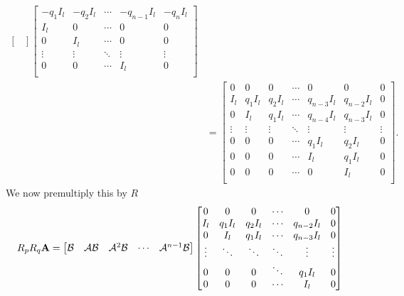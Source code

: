 \begin{appendices}
\begin{equation*}
\begin{split}
\begin{bmatrix}
        \end{bmatrix}
        \begin{bmatrix}
            -q_1I_l & -q_2I_l & \cdots & -q_{n-1}I_l & -q_nI_l \\
            I_l & 0 & \cdots & 0 & 0 \\
            0 & I_l & \cdots & 0 & 0 \\
            \vdots & \vdots & \ddots & \vdots & \vdots \\
            0 & 0 & \cdots & I_l & 0 \\
        \end{bmatrix} \\
        &= 
        \begin{bmatrix}
            0 & 0 & 0 & \cdots & 0 & 0 & 0 \\
            I_l & q_1I_l & q_2I_l & \cdots & q_{n-3}I_l & q_{n-2}I_l & 0 \\ 
            0 & I_l & q_1I_l & \cdots & q_{n-4}I_l & q_{n-3}I_l & 0 \\ 
            \vdots & \vdots & \vdots & \ddots & \vdots & \vdots & \vdots \\
            0 & 0 & 0 & \cdots & q_1I_l & q_2I_l & 0 \\
            0 & 0 & 0 & \cdots & I_l & q_1I_l & 0 \\
            0 & 0 & 0 & \cdots & 0 & I_l & 0 \\
        \end{bmatrix}.
    \end{split} 
\end{equation*}
We now premultiply this by $R$
\begin{equation*}
    \begin{split}
        R_pR_q\mathbf{A} &= 
        \begin{bmatrix}
            \mathcal{B} & \mathcal{A}\mathcal{B} & \mathcal{A}^{2}\mathcal{B} & \cdots & \mathcal{A}^{n-1}\mathcal{B} \\
        \end{bmatrix}
        \begin{bmatrix}
            0 & 0 & 0 & \cdots & 0 & 0 \\
            I_l & q_1I_l & q_2I_l & \cdots & q_{n-2}I_l & 0 \\ 
            0 & I_l & q_1I_l & \cdots & q_{n-3}I_l & 0 \\ 
            \vdots & \ddots & \ddots & \ddots & \vdots & \vdots \\
            0 & 0 & 0 & \ddots & q_1I_l & 0 \\
            0 & 0 & 0 & \cdots & I_l & 0 \\

\end{bmatrix}
\end{split}
\end{equation*}
\end{appendices}
